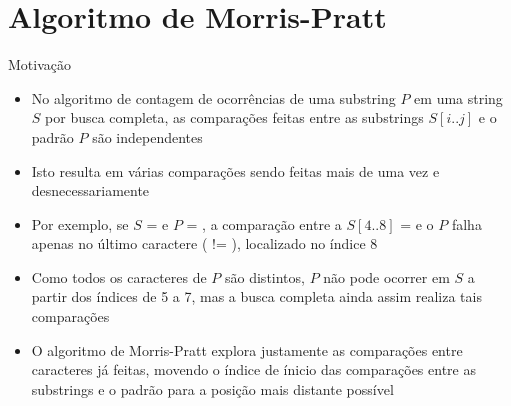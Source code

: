 \section{Algoritmo de Morris-Pratt}

\begin{frame}[fragile]{Motivação}

    \begin{itemize}
        \item No algoritmo de contagem de ocorrências de uma substring $P$ em uma string $S$ por
        busca completa, as comparações feitas entre as substrings $S[i..j]$ e o padrão $P$ 
        são independentes

        \item Isto resulta em várias comparações sendo feitas mais de uma vez e desnecessariamente

        \item Por exemplo, se $S$ =  e $P$ = , a 
            comparação entre a $S[4..8]$ =  e o $P$ falha apenas no último 
            caractere ( != ), localizado no índice 8

        \item Como todos os caracteres de $P$ são distintos, $P$ não pode ocorrer em $S$ a partir 
            dos índices de 5 a 7, mas a busca completa ainda assim realiza tais comparações

        \item O algoritmo de Morris-Pratt explora justamente as comparações entre caracteres já 
            feitas, movendo o índice de ínicio das comparações entre as substrings e o padrão para 
            a posição mais distante possível

    \end{itemize}

\end{frame}

